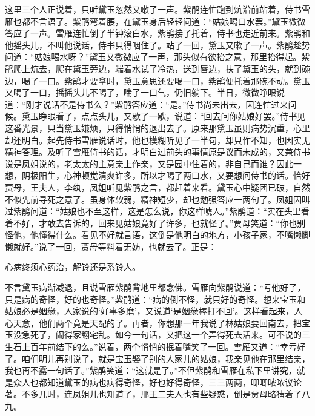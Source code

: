 \begin{parag}
    这里三个人正说着，只听黛玉忽然又嗽了一声。紫鹃连忙跑到炕沿前站着，侍书雪雁也都不言语了。紫鹃弯着腰，在黛玉身后轻轻问道：“姑娘喝口水罢。”黛玉微微答应了一声。雪雁连忙倒了半钟滚白水，紫鹃接了托着，侍书也走近前来。紫鹃和他摇头儿，不叫他说话，侍书只得咽住了。站了一回，黛玉又嗽了一声。紫鹃趁势问道：“姑娘喝水呀？”黛玉又微微应了一声，那头似有欲抬之意，那里抬得起。紫鹃爬上炕去，爬在黛玉旁边，端着水试了冷热，送到唇边，扶了黛玉的头，就到碗边，喝了一口。紫鹃才要拿时，黛玉意思还要喝一口，紫鹃便托着那碗不动。黛玉又喝了一口，摇摇头儿不喝了，喘了一口气，仍旧躺下。半日，微微睁眼说道：“刚才说话不是侍书么？”紫鹃答应道：“是。”侍书尚未出去，因连忙过来问候。黛玉睁眼看了，点点头儿，又歇了一歇，说道：“回去问你姑娘好罢。”侍书见这番光景，只当黛玉嫌烦，只得悄悄的退出去了。原来那黛玉虽则病势沉重，心里却还明白。起先侍书雪雁说话时，他也模糊听见了一半句，却只作不知，也因实无精神答理。及听了雪雁侍书的话，才明白过前头的事情原是议而未成的，又兼侍书说是凤姐说的，老太太的主意亲上作亲，又是园中住着的，非自己而谁？因此一想，阴极阳生，心神顿觉清爽许多，所以才喝了两口水，又要想问侍书的话。恰好贾母，王夫人，李纨，凤姐听见紫鹃之言，都赶着来看。黛玉心中疑团已破，自然不似先前寻死之意了。虽身体软弱，精神短少，却也勉强答应一两句了。凤姐因叫过紫鹃问道：“姑娘也不至这样，这是怎么说，你这样唬人。”紫鹃道：“实在头里看着不好，才敢去告诉的，回来见姑娘竟好了许多，也就怪了。”贾母笑道：“你也别怪他，他懂得什么。看见不好就言语，这倒是他明白的地方，小孩子家，不嘴懒脚懒就好。”说了一回，贾母等料着无妨，也就去了。正是：
\end{parag}


\begin{poem}
    \begin{pl}
        心病终须心药治，解铃还是系铃人。
    \end{pl}
\end{poem}


\begin{parag}
    不言黛玉病渐减退，且说雪雁紫鹃背地里都念佛。雪雁向紫鹃说道：“亏他好了，只是病的奇怪，好的也奇怪。”紫鹃道：“病的倒不怪，就只好的奇怪。想来宝玉和姑娘必是姻缘，人家说的‘好事多磨’，又说道‘是姻缘棒打不回’。这样看起来，人心天意，他们两个竟是天配的了。再者，你想那一年我说了林姑娘要回南去，把宝玉没急死了，闹得家翻宅乱。如今一句话，又把这一个弄得死去活来。可不说的三生石上百年前结下的么。”说着，两个悄悄的抿着嘴笑了一回。雪雁又道：“幸亏好了。咱们明儿再别说了，就是宝玉娶了别的人家儿的姑娘，我亲见他在那里结亲，我也再不露一句话了。”紫鹃笑道：“这就是了。”不但紫鹃和雪雁在私下里讲究，就是众人也都知道黛玉的病也病得奇怪，好也好得奇怪，三三两两，唧唧哝哝议论著。不多几时，连凤姐儿也知道了，邢王二夫人也有些疑惑，倒是贾母略猜着了八九。
\end{parag}



